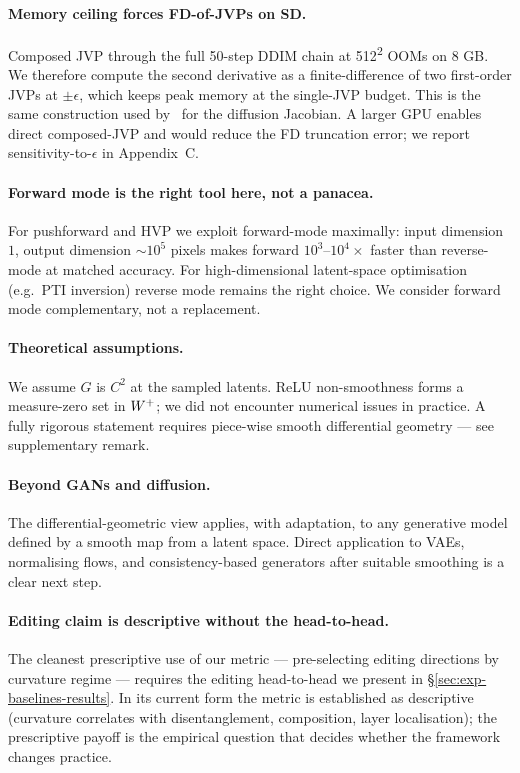 \paragraph{Memory ceiling forces FD-of-JVPs on SD.}
Composed JVP through the full 50-step DDIM chain at 512\textsuperscript{2}
OOMs on 8 GB. We therefore compute the second derivative as a
finite-difference of two first-order JVPs at $\pm\epsilon$, which
keeps peak memory at the single-JVP budget. This is the same
construction used by~\cite{Park2023Riemannian} for the diffusion
Jacobian. A larger GPU enables direct composed-JVP and would
reduce the FD truncation error; we report sensitivity-to-$\epsilon$
in Appendix~C.

\paragraph{Forward mode is the right tool here, not a panacea.}
For pushforward and HVP we exploit forward-mode maximally: input
dimension $1$, output dimension $\sim 10^5$ pixels makes forward
$10^3$--$10^4 \times$ faster than reverse-mode at matched accuracy.
For high-dimensional latent-space optimisation (e.g.\ PTI
inversion) reverse mode remains the right choice. We consider
forward mode complementary, not a replacement.

\paragraph{Theoretical assumptions.}
We assume $G$ is $C^2$ at the sampled latents. ReLU non-smoothness
forms a measure-zero set in $W^+$; we did not encounter numerical
issues in practice. A fully rigorous statement requires piece-wise
smooth differential geometry --- see supplementary remark.

\paragraph{Beyond GANs and diffusion.}
The differential-geometric view applies, with adaptation, to any
generative model defined by a smooth map from a latent space. Direct
application to VAEs, normalising flows, and consistency-based
generators after suitable smoothing is a clear next step.

\paragraph{Editing claim is descriptive without the head-to-head.}
The cleanest prescriptive use of our metric --- pre-selecting
editing directions by curvature regime --- requires the editing
head-to-head we present in \S\ref{sec:exp-baselines-results}.
In its current form the metric is established as descriptive
(curvature correlates with disentanglement, composition, layer
localisation); the prescriptive payoff is the empirical question
that decides whether the framework changes practice.
